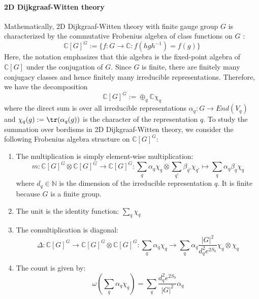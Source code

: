 \documentclass[a4paper,11pt]{article}
\theoremstyle{definition}
\numberwithin{equation}{section}
\begin{document}
\paragraph{2D Dijkgraaf-Witten theory}
Mathematically, 2D Dijkgraaf-Witten theory with finite gauge group $G$ is characterized by the commutative Frobenius algebra of class functions on $G$ \cite{DW}:
\begin{equation}
    \mathbb{C}[G]^G :=\{f:G\rightarrow \mathbb{C}:f(hgh^{-1}) = f(g)\}
\end{equation}
Here, the notation emphasizes that this algebra is the fixed-point algebra of $\mathbb{C}[G]$ under the conjugation of $G$. Since $G$ is finite, there are finitely many conjugacy classes and hence finitely many irreducible representations. Therefore, we have the decomposition
\begin{equation}
    \mathbb{C}[G]^G := \oplus_q \mathbb{C}\chi_q
\end{equation}
where the direct sum is over all irreducible representations $\alpha_q:G\rightarrow End(V_q)$ and $\chi_q(g) := \tr(\alpha_q(g))$ is the character of the representation $q$. To study the summation over bordisms in 2D Dijkgraaf-Witten theory, we consider the following Frobenius algebra structure on $\mathbb{C}[G]^G$:
\begin{enumerate}
    \item The multiplication is simply element-wise multiplication:
    \begin{equation}
        m:\mathbb{C}[G]^G\otimes\mathbb{C}[G]^G\rightarrow\mathbb{C}[G]^G:\sum_q\alpha_q\chi_q\otimes\sum_{q'}\beta_{q'}\chi_{q'} \mapsto \sum_q\alpha_q\beta_q\chi_q
    \end{equation}
    where $d_q \in\mathbb{N}$ is the dimension of the irreducible representation $q$. It is finite because $G$ is a finite group.
    \item The unit is the identity function: $\sum_q\chi_q$
    \item The comultiplication is diagonal:
    \begin{equation}
        \Delta:\mathbb{C}[G]^G\rightarrow\mathbb{C}[G]^G\otimes\mathbb{C}[G]^G:\sum_q\alpha_q\chi_q\rightarrow\sum_q\alpha_q\frac{|G|^2}{d_q^2e^{2S_0}}\chi_q\otimes\chi_q
    \end{equation}
    \item The count is given by:
    \begin{equation}
        \omega(\sum_q\alpha_q\chi_q) = \sum_q\frac{d_q^2e^{2S_0}}{|G|^2}\alpha_q
    \end{equation}
\end{enumerate}
\end{document}
